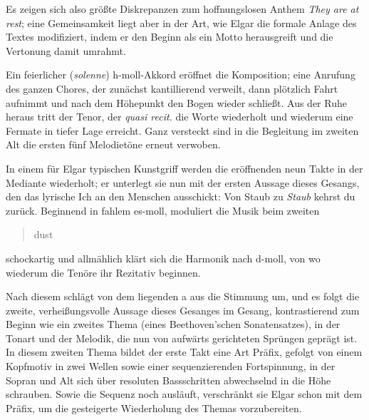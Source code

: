 \documentclass[a4paper,11pt,open=any]{scrbook}
\newcommand{\engquote}[1]{\foreignblockquote{english}{#1}}
\begin{document}
Es zeigen sich also größte Diskrepanzen zum hoffnungslosen Anthem \textit{They
are at rest}; eine Gemeinsamkeit liegt aber in der Art, wie Elgar die formale
Anlage des Textes modifiziert, indem er den Beginn als ein Motto herausgreift
und die Vertonung damit umrahmt.

Ein feierlicher (\textit{solenne}) h-moll-Akkord eröffnet die Komposition;
eine Anrufung des ganzen Chores, der zunächst kantillierend verweilt, dann
plötzlich Fahrt aufnimmt und nach dem Höhepunkt den Bogen wieder schließt.
Aus der Ruhe heraus tritt der Tenor, der \textit{quasi recit.} die Worte
wiederholt und wiederum eine Fermate in tiefer Lage erreicht.  Ganz versteckt
sind in die Begleitung im zweiten Alt die ersten fünf Melodietöne erneut
verwoben.

In einem für Elgar typischen Kunstgriff werden die eröffnenden neun Takte in
der Mediante wiederholt; er unterlegt sie nun mit der ersten Aussage dieses
Gesangs, den das lyrische Ich an den Menschen ausschickt: Von Staub zu
\emph{Staub} kehrst du zurück.  Beginnend in fahlem es-moll, moduliert die
Musik beim zweiten \engquote{dust} schockartig und allmählich klärt sich die
Harmonik nach d-moll, von wo wiederum die Tenöre ihr Rezitativ beginnen.

Nach diesem schlägt von dem liegenden a aus die Stimmung um, und es folgt die
zweite, verheißungsvolle Aussage dieses Gesanges im Gesang, kontrastierend
zum Beginn wie ein zweites Thema (eines Beethoven’schen Sonatensatzes), in
der Tonart und der Melodik, die nun von aufwärts gerichteten Sprüngen geprägt
ist.  In diesem zweiten Thema bildet der erste Takt eine Art Präfix, gefolgt
von einem Kopfmotiv in zwei Wellen sowie einer sequenzierenden Fortspinnung,
in der Sopran und Alt sich über resoluten Bassschritten abwechselnd in die
Höhe schrauben.  Sowie die Sequenz noch ausläuft, verschränkt sie Elgar schon
mit dem Präfix, um die gesteigerte Wiederholung des Themas vorzubereiten.
\end{document}
